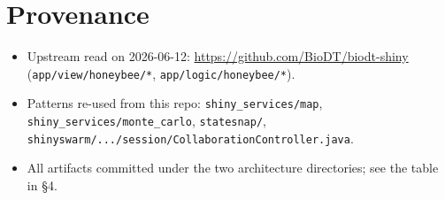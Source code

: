 \documentclass[12pt,a4paper]{article}
\begin{document}
\section{Provenance}

\begin{itemize}[nosep]
  \item Upstream read on 2026-06-12: \url{https://github.com/BioDT/biodt-shiny}
    (\texttt{app/view/honeybee/*}, \texttt{app/logic/honeybee/*}).
  \item Patterns re-used from this repo: \texttt{shiny\_services/map},
    \texttt{shiny\_services/monte\_carlo}, \texttt{statesnap/},
    \texttt{shinyswarm/.../session/CollaborationController.java}.
  \item All artifacts committed under the two architecture directories; see the
    table in \S4.
\end{itemize}
\end{document}

